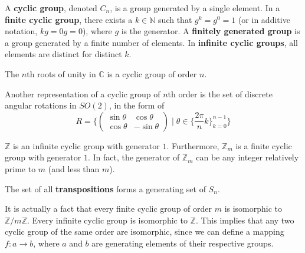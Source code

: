   \begin{definition}
    A \textbf{cyclic group}, denoted $C_{n}$, is a group generated by a single element. In a \textbf{finite cyclic group}, there exists a $k \in \mathbb{N}$ such that $g^{k} = g^{0} = 1$ (or in additive notation, $kg = 0g = 0$), where $g$ is the generator. A \textbf{finitely generated group} is a group generated by a finite number of elements. In \textbf{infinite cyclic groups}, all elements are distinct for distinct $k$. 
  \end{definition}

  \begin{example}
    The $n$th roots of unity in $\mathbb{C}$ is a cyclic group of order $n$. 
  \end{example}

  \begin{example}
    Another representation of a cyclic group of $n$th order is the set of discrete angular rotations in $SO(2)$, in the form of 
    \begin{equation}
      R =  \bigg\{ \begin{pmatrix}
      \sin{\theta} & \cos{\theta} \\
      \cos{\theta} & -\sin{\theta}
      \end{pmatrix}\; \bigg| \; \theta \in \Big\{\frac{2 \pi}{n} k\Big\}_{k = 0}^{n-1} \bigg\}
    \end{equation}
  \end{example}

  \begin{example}[Integers]
    $\mathbb{Z}$ is an infinite cyclic group with generator $1$. Furthermore, $\mathbb{Z}_m$ is a finite cyclic group with generator $1$. In fact, the generator of $\mathbb{Z}_m$ can be any integer relatively prime to $m$ (and less than $m$). 
  \end{example}

  \begin{theorem}[Transpositions]
    The set of all \textbf{transpositions} forms a generating set of $S_{n}$. 
  \end{theorem}

  It is actually a fact that every finite cyclic group of order $m$ is isomorphic to $\mathbb{Z}/m\mathbb{Z}$. Every infinite cyclic group is isomorphic to $\mathbb{Z}$. This implies that any two cyclic group of the same order are isomorphic, since we can define a mapping $f:a\longrightarrow b$, where $a$ and $b$ are generating elements of their respective groups. 

